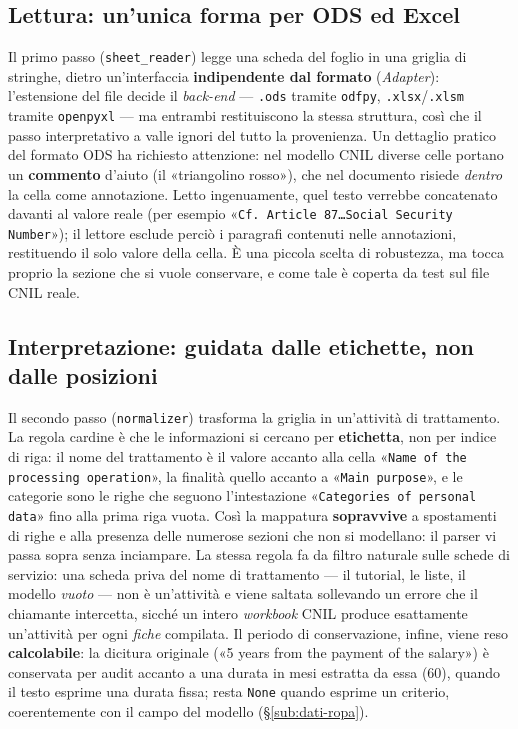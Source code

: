 \subsection{Lettura: un'unica forma per ODS ed Excel}
\label{sub:impl-b1-lettura}

Il primo passo (\texttt{sheet\_reader}) legge una scheda del foglio in una griglia di stringhe, dietro un'interfaccia \textbf{indipendente dal formato} (\emph{Adapter}): l'estensione del file decide il \textit{back-end} --- \texttt{.ods} tramite \texttt{odfpy}, \texttt{.xlsx}/\texttt{.xlsm} tramite \texttt{openpyxl} --- ma entrambi restituiscono la stessa struttura, così che il passo interpretativo a valle ignori del tutto la provenienza. Un dettaglio pratico del formato ODS ha richiesto attenzione: nel modello CNIL diverse celle portano un \textbf{commento} d'aiuto (il «triangolino rosso»), che nel documento risiede \emph{dentro} la cella come annotazione. Letto ingenuamente, quel testo verrebbe concatenato davanti al valore reale (per esempio «\texttt{Cf.\ Article~87\ldots{}Social Security Number}»); il lettore esclude perciò i paragrafi contenuti nelle annotazioni, restituendo il solo valore della cella. È una piccola scelta di robustezza, ma tocca proprio la sezione che si vuole conservare, e come tale è coperta da test sul file CNIL reale.

\subsection{Interpretazione: guidata dalle etichette, non dalle posizioni}
\label{sub:impl-b1-normalizer}

Il secondo passo (\texttt{normalizer}) trasforma la griglia in un'attività di trattamento. La regola cardine è che le informazioni si cercano per \textbf{etichetta}, non per indice di riga: il nome del trattamento è il valore accanto alla cella «\texttt{Name of the processing operation}», la finalità quello accanto a «\texttt{Main purpose}», e le categorie sono le righe che seguono l'intestazione «\texttt{Categories of personal data}» fino alla prima riga vuota. Così la mappatura \textbf{sopravvive} a spostamenti di righe e alla presenza delle numerose sezioni che non si modellano: il parser vi passa sopra senza inciampare. La stessa regola fa da filtro naturale sulle schede di servizio: una scheda priva del nome di trattamento --- il tutorial, le liste, il modello \emph{vuoto} --- non è un'attività e viene saltata sollevando un errore che il chiamante intercetta, sicché un intero \emph{workbook} CNIL produce esattamente un'attività per ogni \emph{fiche} compilata. Il periodo di conservazione, infine, viene reso \textbf{calcolabile}: la dicitura originale («5 years from the payment of the salary») è conservata per audit accanto a una durata in mesi estratta da essa (60), quando il testo esprime una durata fissa; resta \texttt{None} quando esprime un criterio, coerentemente con il campo del modello (§\ref{sub:dati-ropa}).

